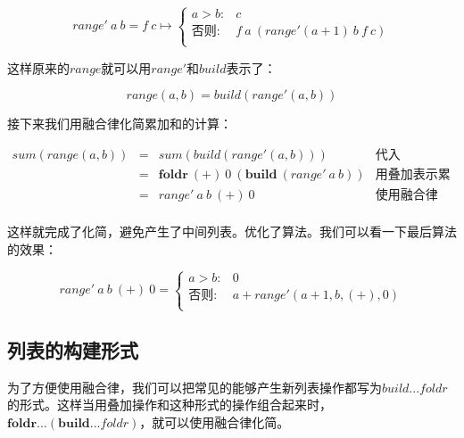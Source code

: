 \documentclass{article}
\begin{document}
\[
range'\ a\ b = f\ c \mapsto
  \begin{cases}
  a > b: & c \\
  \text{否则}: & f\ a\ (range' (a+1)\ b\ f\ c) \\
  \end{cases}
\]

这样原来的$range$就可以用$range'$和$build$表示了：

\[
range(a, b) = build(range'(a, b))
\]

接下来我们用融合律化简累加和的计算：

\[
\begin{array}{rcll}
sum(range(a, b)) & = & sum(build(range'(a, b))) & \text{代入} \\
  & = & \pmb{foldr}\ (+)\ 0\ (\pmb{build}\ (range'\ a\ b)) & \text{用叠加表示累加} \\
  & = & range'\ a\ b\ (+)\ 0 & \text{使用融合律} \\
\end{array}
\]

这样就完成了化简，避免产生了中间列表。优化了算法。我们可以看一下最后算法的效果：

\[
range'\ a\ b\ (+)\ 0 =
  \begin{cases}
  a > b: & 0 \\
  \text{否则}: & a + range'(a+1, b, (+), 0) \\
  \end{cases}
\]

\subsection{列表的构建形式}

为了方便使用融合律，我们可以把常见的能够产生新列表操作都写为$build...foldr$的形式。这样当用叠加操作和这种形式的操作组合起来时，$\pmb{foldr}...(\pmb{build}...foldr)$，就可以使用融合律化简。
\end{document}
